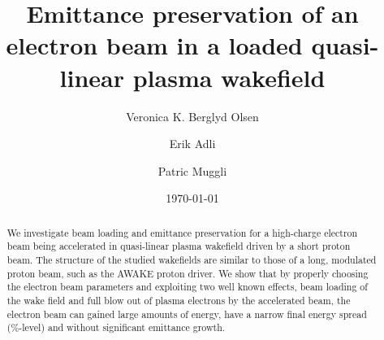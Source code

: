 \documentclass[aps,prstab,reprint,amsmath,amssymb,groupedaddress,onecolumn]{revtex4-1}
\begin{document}


\title{Emittance preservation of an electron beam in a loaded quasi-linear plasma wakefield}

\author{Veronica K. Berglyd Olsen}

\author{Erik Adli}

\author{Patric Muggli}

\date{\today}

\begin{abstract}
We investigate beam loading and emittance preservation for a high-charge electron beam being accelerated in quasi-linear
plasma wakefield driven by a short proton beam. The structure of the studied wakefields are similar to those of a long, modulated
proton beam, such as the AWAKE proton driver.  We show that by %
properly choosing the electron beam parameters and exploiting two well known effects, beam loading of the wake field and full blow out
of plasma electrons by the accelerated beam, the electron beam can %
gained large amounts of energy, have a narrow final energy spread (\%-level) and without significant emittance growth.
\end{abstract}
\end{document}
